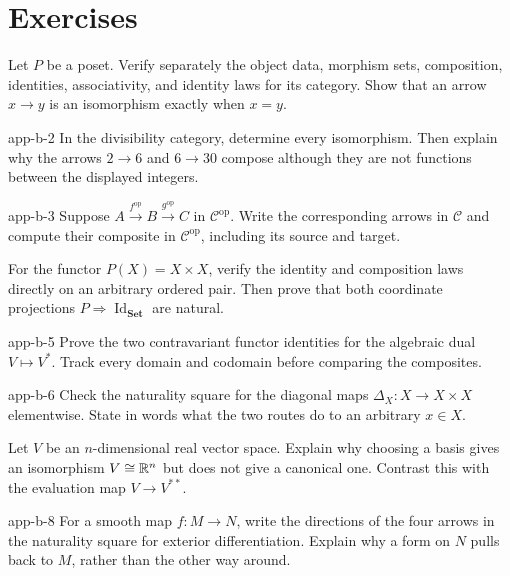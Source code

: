 \section*{Exercises}

\begin{exercise}
Let $P$ be a poset. Verify separately the object data, morphism sets,
composition, identities, associativity, and identity laws for its category.
Show that an arrow $x\to y$ is an isomorphism exactly when $x=y$.
\end{exercise}

\begin{hexercise}{app-b-2}
In the divisibility category, determine every isomorphism. Then explain why
the arrows $2\to6$ and $6\to30$ compose although they are not functions
between the displayed integers.
\end{hexercise}

\begin{hexercise}{app-b-3}
Suppose $A\xrightarrow{f^{\mathrm{op}}}B
\xrightarrow{g^{\mathrm{op}}}C$ in $\mathcal C^{\mathrm{op}}$. Write the
corresponding arrows in $\mathcal C$ and compute their composite in
$\mathcal C^{\mathrm{op}}$, including its source and target.
\end{hexercise}

\begin{exercise}
For the functor $P(X)=X\times X$, verify the identity and composition laws
directly on an arbitrary ordered pair. Then prove that both coordinate
projections $P\Rightarrow\operatorname{Id}_{\mathbf{Set}}$ are natural.
\end{exercise}

\begin{hexercise}{app-b-5}
Prove the two contravariant functor identities for the algebraic dual
$V\mapsto V^*$. Track every domain and codomain before comparing the
composites.
\end{hexercise}

\begin{hexercise}{app-b-6}
Check the naturality square for the diagonal maps
$\Delta_X:X\to X\times X$ elementwise. State in words what the two routes do
to an arbitrary $x\in X$.
\end{hexercise}

\begin{exercise}
Let $V$ be an $n$-dimensional real vector space. Explain why choosing a basis
gives an isomorphism $V\cong\mathbb{R}^n$ but does not give a canonical one. Contrast
this with the evaluation map $V\to V^{**}$.
\end{exercise}

\begin{hexercise}{app-b-8}
For a smooth map $f:M\to N$, write the directions of the four arrows in the
naturality square for exterior differentiation. Explain why a form on $N$
pulls back to $M$, rather than the other way around.
\end{hexercise}
